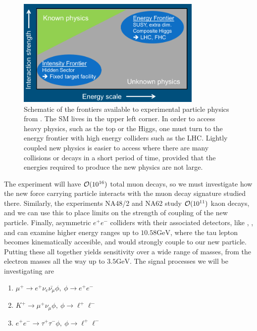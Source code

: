 \begin{figure}[h]
    \centering
    \includegraphics[width = 0.8\textwidth]{Figures/misc/frontiers}
    \caption{Schematic of the frontiers available to experimental particle physics from \cite{Alekhin:2015byh}. The SM lives in the upper left corner. In order to access heavy physics, such as the top or the Higgs, one must turn to the energy frontier with high energy colliders such as the LHC. Lightly coupled new physics is easier to access where there are many collisions or decays in a short period of time, provided that the energies required to produce the new physics are not large.}
    \label{fig:frontiers}
\end{figure}

The experiment \mueee will have $\operatorname{\mathcal{O}}(10^{16})$ total muon decays, so we must investigate how the new force carrying particle interacts with the muon decay signature studied there.
Similarly, the experiments NA48/2 and NA62 study $\operatorname{\mathcal{O}}(10^{11})$ kaon decays, and we can use this to place limits on the strength of coupling of the new particle.
Finally, asymmetric $e^+ e^-$ colliders with their associated detectors, like \babar, \belle, and \belletwo can examine higher energy ranges up to $10.58\textrm{GeV}$, where the tau lepton becomes kinematically accesible, and would strongly couple to our new particle.
Putting these all together yields sensitivity over a wide range of masses, from the electron masses all the way up to $3.5\textrm{GeV}$.
The signal processes we will be investigating are

\begin{enumerate}
\item $\mu^+ \rightarrow e^+ \nu_e \bar{\nu_\mu} \phi,~\phi \rightarrow e^+ e^-$
\item $K^+ \rightarrow \mu^+ \nu_\mu \phi,~\phi \rightarrow \ell^+ \ell^-$
\item $e^+ e^- \rightarrow \tau^+ \tau^- \phi,~\phi \rightarrow \ell^+ \ell^-$
\end{enumerate}

